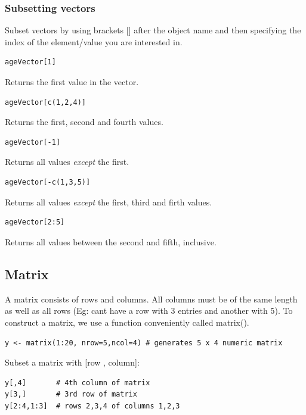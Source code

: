 \documentclass[]{book}
\begin{document}
\hypertarget{subsetting-vectors}{%
\subsubsection{Subsetting vectors}\label{subsetting-vectors}}

Subset vectors by using brackets {[}{]} after the object name and then specifying the index of the element/value you are interested in.

\begin{verbatim}
ageVector[1]
\end{verbatim}

Returns the first value in the vector.

\begin{verbatim}
ageVector[c(1,2,4)]
\end{verbatim}

Returns the first, second and fourth values.

\begin{verbatim}
ageVector[-1]
\end{verbatim}

Returns all values \emph{except} the first.

\begin{verbatim}
ageVector[-c(1,3,5)]
\end{verbatim}

Returns all values \emph{except} the first, third and firth values.

\begin{verbatim}
ageVector[2:5]
\end{verbatim}

Returns all values between the second and fifth, inclusive.

\hypertarget{matrix}{%
\subsection{Matrix}\label{matrix}}

A matrix consists of rows and columns. All columns must be of the same length as well as all rows (Eg: cant have a row with 3 entries and another with 5). To construct a matrix, we use a function conveniently called matrix().

\texttt{y\ \textless{}-\ matrix(1:20,\ nrow=5,ncol=4)\ \#\ generates\ 5\ x\ 4\ numeric\ matrix}

Subset a matrix with {[}row , column{]}:

\begin{verbatim}
y[,4]       # 4th column of matrix
y[3,]       # 3rd row of matrix
y[2:4,1:3]  # rows 2,3,4 of columns 1,2,3
\end{verbatim}
\end{document}
